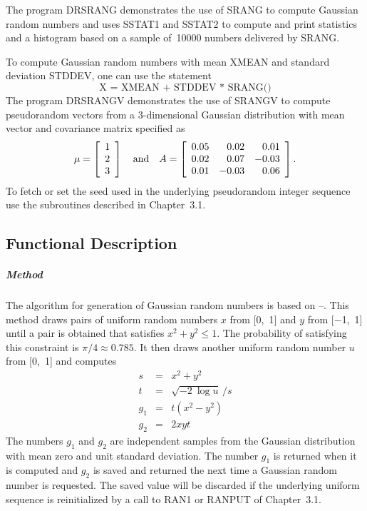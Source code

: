 \documentclass[twoside]{MATH77}
\begin{document}
The program DRSRANG demonstrates the use of SRANG to compute Gaussian random
numbers and uses SSTAT1 and SSTAT2 to compute and print statistics and a
histogram based on a sample of~10000 numbers delivered by SRANG.

To compute Gaussian random numbers with mean XMEAN and standard deviation
STDDEV, one can use the statement
$$
\text{X = XMEAN + STDDEV }*\text{ SRANG()}
$$
The program DRSRANGV demonstrates the use of SRANGV to compute pseudorandom
vectors from a 3-dimensional Gaussian distribution with mean vector and
covariance matrix specified as%
$$
{\bf \mu } =\left[
\begin{array}{c}
1 \\
2 \\
3
\end{array}
\right] \quad \text{and}\quad A=\left[
\begin{array}{rrr}
0.05 & 0.02 & 0.01 \\
0.02 & 0.07 & -0.03 \\
0.01 & -0.03 & 0.06
\end{array}
\right] .
$$
To fetch or set the seed used in the underlying pseudorandom integer
sequence use the subroutines described in Chapter~3.1.

\subsection{Functional Description}

\subparagraph{Method}

The algorithm for generation of Gaussian random numbers is based on
\cite{Bell:1968:A334}--\nocite{Box:1958:NOG}\cite{vonNeumann:1959:VTU}.
This method draws pairs of uniform random numbers $x$ from
[0,~1] and $y$ from [$-$1,~1] until a pair is obtained that
satisfies $x^2 + y^2 \leq 1$.
The probability of satisfying this constraint is $\pi /4 \approx 0.785$. It
then draws another uniform random number $u$ from [0,~1] and computes
\begin{eqnarray*}
s & = & x^2 + y^2\\
t & = & \sqrt{-2\ \log u} \,/s\\
g_1 & = & t(x^2 - y^2)\\
g_2 & = & 2xyt
\end{eqnarray*}
The numbers $g_1$ and $g_2$ are independent samples from the Gaussian
distribution with mean zero and unit standard deviation. The number $g_1$ is
returned when it is computed and $g_2$ is saved and returned the next time a
Gaussian random number is requested. The saved value will be discarded if
the underlying uniform sequence is reinitialized by a call to RAN1 or RANPUT
of Chapter~3.1.
\end{document}
